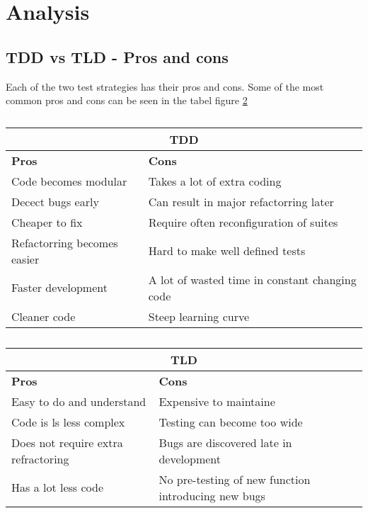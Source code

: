 \section{Analysis}
\label{section:analysis}


\subsection{TDD vs TLD - Pros and cons}
 
Each of the two test strategies has their pros and cons. Some of the most common pros and cons can be seen 
in the tabel figure 
\ref{table: procons} 
\begin{table}[h]
    
    \centering
    \begin{tabular}{|l | l|}
        \hline
        \multicolumn{2}{|c|}{TDD} \\
        \hline
        \textbf{Pros} & \textbf{Cons}  \\ \hline
        Code becomes modular &  Takes a lot of extra coding  \\ 
        Decect bugs early & Can result in major refactorring later   \\ 
        Cheaper to fix &  Require often reconfiguration of suites  \\
        Refactorring becomes easier &  Hard to make well defined tests  \\      
        Faster development &  A lot of wasted time in constant changing code \\ 
        Cleaner code &  Steep learning curve  \\   
        \hline
    \end{tabular}
    \quad
    \newline
    \newline  
    \begin{tabular}{|l| l|}
        \hline
        \multicolumn{2}{|c|}{TLD} \\
        \hline
        \textbf{Pros} & \textbf{Cons}  \\ \hline
        Easy to do and understand &  Expensive to maintaine  \\ 
        Code is ls less complex & Testing can become too wide  \\ 
        Does not require extra refractoring &  Bugs are discovered late in development  \\
        Has a lot less code & No pre-testing of new function introducing new bugs  \\  \hline
    
    \end{tabular}
    \caption{}  
    \label{table: procons}
    \end{table}



